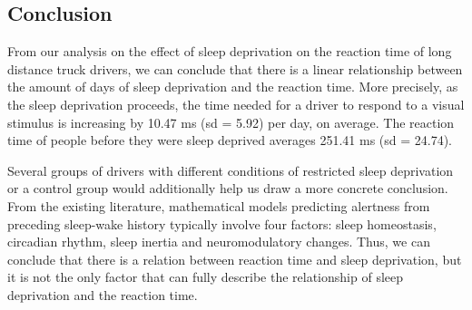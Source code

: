 \documentclass[
]{article}
\begin{document}
\hypertarget{conclusion}{%
\subsection{Conclusion}\label{conclusion}}

From our analysis on the effect of sleep deprivation on the reaction
time of long distance truck drivers, we can conclude that there is a
linear relationship between the amount of days of sleep deprivation and
the reaction time. More precisely, as the sleep deprivation proceeds,
the time needed for a driver to respond to a visual stimulus is
increasing by 10.47 ms (sd = 5.92) per day, on average. The reaction
time of people before they were sleep deprived averages 251.41 ms (sd =
24.74).

Several groups of drivers with different conditions of restricted sleep
deprivation or a control group would additionally help us draw a more
concrete conclusion. From the existing literature, mathematical models
predicting alertness from preceding sleep-wake history typically involve
four factors: sleep homeostasis, circadian rhythm, sleep inertia and
neuromodulatory changes. Thus, we can conclude that there is a relation
between reaction time and sleep deprivation, but it is not the only
factor that can fully describe the relationship of sleep deprivation and
the reaction time.
\end{document}
